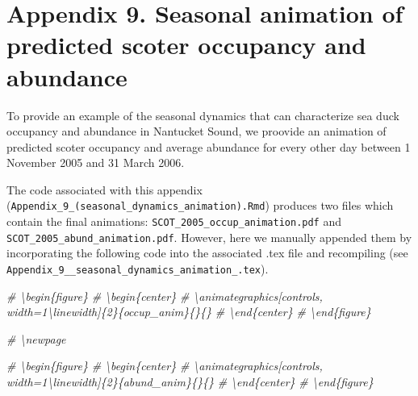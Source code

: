 \documentclass[12pt,]{article}
\title{}
\author{}
\date{}
\newenvironment{Shaded}{\begin{snugshade}}{\end{snugshade}}
\newcommand{\CommentTok}[1]{\textcolor[rgb]{0.56,0.35,0.01}{\textit{{#1}}}}
\begin{document}
\maketitle


\section{Appendix 9. Seasonal animation of predicted scoter occupancy
and
abundance}\label{appendix-9.-seasonal-animation-of-predicted-scoter-occupancy-and-abundance}

To provide an example of the seasonal dynamics that can characterize sea
duck occupancy and abundance in Nantucket Sound, we proovide an
animation of predicted scoter occupancy and average abundance for every
other day between 1 November 2005 and 31 March 2006.

The code associated with this appendix
(\texttt{Appendix\_9\_(seasonal\_dynamics\_animation).Rmd}) produces two
files which contain the final animations:
\texttt{SCOT\_2005\_occup\_animation.pdf} and
\texttt{SCOT\_2005\_abund\_animation.pdf}. However, here we manually
appended them by incorporating the following code into the associated
.tex file and recompiling (see
\texttt{Appendix\_9\_\_seasonal\_dynamics\_animation\_.tex}).

\begin{Shaded}
\begin{Highlighting}[]
\CommentTok{# \textbackslash{}begin\{figure\}}
\CommentTok{# \textbackslash{}begin\{center\}}
\CommentTok{# \textbackslash{}animategraphics[controls, width=1\textbackslash{}linewidth]\{2\}\{occup_anim\}\{\}\{\}}
\CommentTok{# \textbackslash{}end\{center\}}
\CommentTok{# \textbackslash{}end\{figure\}}

\CommentTok{# \textbackslash{}newpage}

\CommentTok{# \textbackslash{}begin\{figure\}}
\CommentTok{# \textbackslash{}begin\{center\}}
\CommentTok{# \textbackslash{}animategraphics[controls, width=1\textbackslash{}linewidth]\{2\}\{abund_anim\}\{\}\{\}}
\CommentTok{# \textbackslash{}end\{center\}}
\CommentTok{# \textbackslash{}end\{figure\}}
\end{Highlighting}
\end{Shaded}


\begin{figure}
\begin{center}
\end{center}
\end{figure}

\newpage

\begin{figure}
\begin{center}
\end{center}
\end{figure}
\end{document}
